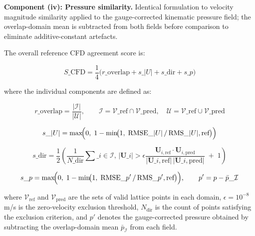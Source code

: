 \documentclass[preprint,12pt,number]{elsarticle}
\begin{document}
\textbf{Component (iv): Pressure similarity.} Identical formulation to velocity magnitude similarity applied to the gauge-corrected kinematic pressure field; the overlap-domain mean is subtracted from both fields before comparison to eliminate additive-constant artefacts.

The overall reference CFD agreement score is:

\begin{equation}
S\_\text{CFD} = \frac{1}{4}\bigl(r\_\text{overlap} + s\_{|U|} + s\_\text{dir} + s\_p\bigr)
\label{eq:cfd-agreement-score}
\end{equation}

where the individual components are defined as:

\begin{equation}
r\_\text{overlap} = \frac{|\mathcal{I}|}{|\mathcal{U}|}, \qquad \mathcal{I} = \mathcal{V}\_\text{ref} \cap \mathcal{V}\_\text{pred}, \quad \mathcal{U} = \mathcal{V}\_\text{ref} \cup \mathcal{V}\_\text{pred}
\label{eq:overlap-ratio}
\end{equation}

\begin{equation}
s\_{|U|} = \max\!\Bigl(0,\; 1 - \min\!\bigl(1,\; \text{RMSE}\_{|U|}\, /\, \text{RMS}\_{|U|,\text{ref}}\bigr)\Bigr)
\label{eq:vel-mag-sim}
\end{equation}

\begin{equation}
s\_\text{dir} = \frac{1}{2}\!\left(\frac{1}{N\_\text{dir}} \sum\_{i \in \mathcal{I},\, |\mathbf{U}\_i| > \epsilon} \frac{\mathbf{U}_{i,\text{ref}} \cdot \mathbf{U}_{i,\text{pred}}}{|\mathbf{U}\_{i,\text{ref}}|\,|\mathbf{U}\_{i,\text{pred}}|} \;+\; 1\right)
\label{eq:vel-dir-sim}
\end{equation}

\begin{equation}
s\_p = \max\!\Bigl(0,\; 1 - \min\!\bigl(1,\; \text{RMSE}\_{p'}\, /\, \text{RMS}\_{p',\text{ref}}\bigr)\Bigr), \qquad p' = p - \bar{p}\_{\mathcal{I}}
\label{eq:pressure-sim}
\end{equation}

where $\mathcal{V}_\text{ref}$ and $\mathcal{V}_\text{pred}$ are the sets of valid lattice points in each domain, $\epsilon = 10^{-8}$ m/s is the zero-velocity exclusion threshold, $N_\text{dir}$ is the count of points satisfying the exclusion criterion, and $p'$ denotes the gauge-corrected pressure obtained by subtracting the overlap-domain mean $\bar{p}_{\mathcal{I}}$ from each field.
\end{document}
